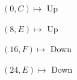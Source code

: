 \documentclass[preview]{standalone}
\begin{document}
\begin{center}
$(0,C) \mapsto$ Up

$(8,E) \mapsto$ Up

$(16,F) \mapsto$ Down

$(24,E) \mapsto$ Down
\end{center}
\end{document}
